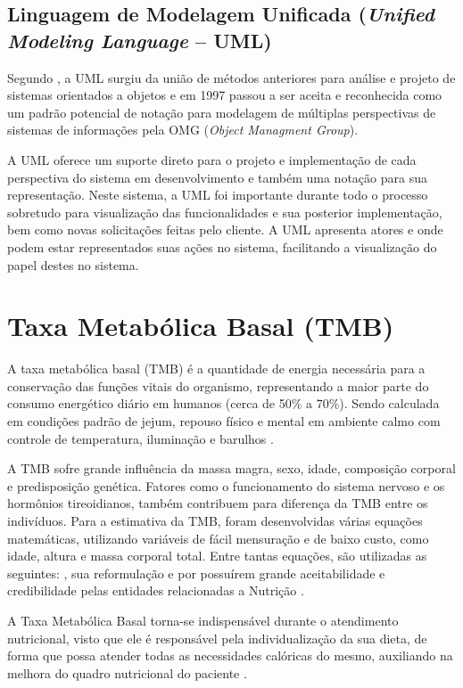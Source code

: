 \documentclass[
	12pt,				%
    oneside,			%
	a4paper,			%
	english,			%
	french,				%
	spanish,			%
	brazil,				%
	]{abntex2}
\begin{document}
\subsection{Linguagem de Modelagem Unificada (\textit{Unified Modeling Language} – UML)}

Segundo , a UML surgiu da união de métodos anteriores para
análise e projeto de sistemas orientados a objetos e em 1997 passou a ser aceita e
reconhecida como um padrão potencial de notação para modelagem de múltiplas
perspectivas de sistemas de informações pela OMG (\textit{Object Managment Group}). 

A UML oferece um suporte direto para o projeto e
implementação de cada perspectiva do sistema em desenvolvimento e também uma
notação para sua representação. Neste sistema, a UML foi importante durante todo o
processo sobretudo para visualização das funcionalidades e sua posterior 
implementação, bem como novas solicitações feitas pelo cliente. A UML apresenta
atores e onde podem estar representados suas ações no sistema, facilitando a
visualização do papel destes no sistema.

\section{Taxa Metabólica Basal (TMB)}

A taxa metabólica basal (TMB) é a quantidade de energia necessária para a
conservação das funções vitais do organismo, representando a maior parte do
consumo energético diário em humanos (cerca de 50\% a 70\%). Sendo calculada em
condições padrão de jejum, repouso físico e mental em ambiente calmo com controle
de temperatura, iluminação e barulhos \cite{ruiz} \cite{harris1}.

A TMB sofre grande influência da massa magra, sexo, idade, composição
corporal e predisposição genética. Fatores como o funcionamento do sistema nervoso
e os hormônios tireoidianos, também contribuem para diferença da TMB entre os
indivíduos. Para a estimativa da TMB, foram desenvolvidas várias equações
matemáticas, utilizando variáveis de fácil mensuração e de baixo custo, como idade,
altura e massa corporal total. Entre tantas equações, são utilizadas as seguintes:
, sua reformulação  e  por possuírem grande
aceitabilidade e credibilidade pelas entidades relacionadas a Nutrição \cite{weijs}.

A Taxa Metabólica Basal torna-se indispensável durante o atendimento nutricional, visto
que ele é responsável pela individualização da sua dieta, de forma que possa atender
todas as necessidades calóricas do mesmo, auxiliando na melhora do quadro
nutricional do paciente \cite{pedrosa}.
\end{document}
